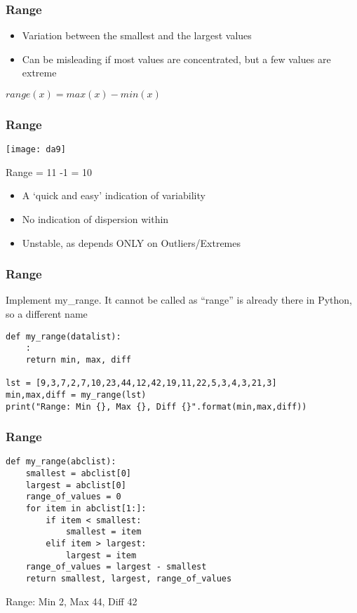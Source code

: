 \begin{frame}[fragile]\frametitle{Range}	
\begin{itemize}
\item Variation between the smallest and the largest values
\item Can be misleading if most values are concentrated, but a few values are extreme
\end{itemize}
$range(x) = max(x) - min(x)$

\end{frame}

\begin{frame}[fragile]\frametitle{Range}	
\begin{center}
\texttt{[image: da9]}
\end{center}
Range = 11 -1 = 10

\begin{itemize}
\item A `quick and easy' indication of variability
\item No indication of dispersion within
\item Unstable, as depends ONLY on Outliers/Extremes
\end{itemize}
\end{frame}

\begin{frame}[fragile]\frametitle{Range}
Implement my\_range. It cannot be called as ``range'' is already there in Python, so a different name
\begin{lstlisting}
def my_range(datalist):
	:
	return min, max, diff

lst = [9,3,7,2,7,10,23,44,12,42,19,11,22,5,3,4,3,21,3]
min,max,diff = my_range(lst)
print("Range: Min {}, Max {}, Diff {}".format(min,max,diff))
\end{lstlisting}
\end{frame}

\begin{frame}[fragile]\frametitle{Range}
\begin{lstlisting}
def my_range(abclist):
    smallest = abclist[0]
    largest = abclist[0]
    range_of_values = 0
    for item in abclist[1:]:
        if item < smallest:
            smallest = item
        elif item > largest:
            largest = item
    range_of_values = largest - smallest
    return smallest, largest, range_of_values
\end{lstlisting}
Range: Min 2, Max 44, Diff 42
\end{frame}


